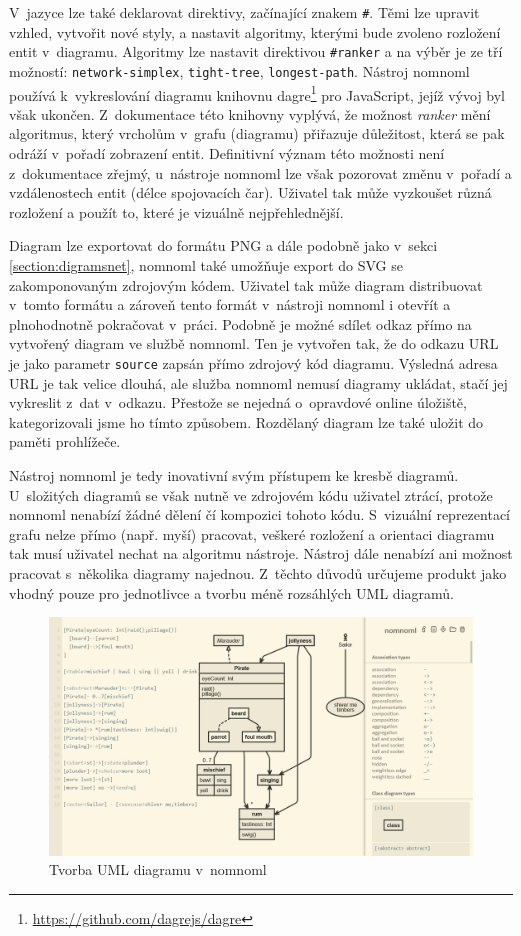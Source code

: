 V~jazyce lze také deklarovat direktivy, začínající znakem \texttt{\#}. Těmi lze
upravit vzhled, vytvořit nové styly, a nastavit algoritmy, kterými bude zvoleno
rozložení entit v~diagramu. Algoritmy lze nastavit direktivou \texttt{\#ranker}
a na výběr je ze tří možností: \texttt{network-simplex}, \texttt{tight-tree},
\texttt{longest-path}. Nástroj nomnoml používá k~vykreslování diagramu knihovnu
dagre\footnote{\url{https://github.com/dagrejs/dagre}} pro JavaScript, jejíž
vývoj byl však ukončen. Z~dokumentace této knihovny vyplývá, že možnost
\emph{ranker} mění algoritmus, který vrcholům v~grafu (diagramu) přiřazuje
důležitost, která se pak odráží v~pořadí zobrazení entit. Definitivní význam
této možnosti není z~dokumentace zřejmý, u~nástroje nomnoml lze však pozorovat
změnu v~pořadí a vzdálenostech entit (délce spojovacích čar). Uživatel tak může
vyzkoušet různá rozložení a použít to, které je vizuálně nejpřehlednější.

Diagram lze exportovat do formátu PNG a dále podobně jako v~sekci
\ref{section:digramsnet}, nomnoml také umožňuje export do SVG se zakomponovaným
zdrojovým kódem. Uživatel tak může diagram distribuovat v~tomto formátu a
zároveň tento formát v~nástroji nomnoml i otevřít a plnohodnotně pokračovat
v~práci. Podobně je možné sdílet odkaz přímo na vytvořený diagram ve službě
nomnoml. Ten je vytvořen tak, že do odkazu URL je jako parametr \texttt{source}
zapsán přímo zdrojový kód diagramu. Výsledná adresa URL je tak velice dlouhá,
ale služba nomnoml nemusí diagramy ukládat, stačí jej vykreslit z~dat v~odkazu.
Přestože se nejedná o~opravdové online úložiště, kategorizovali jsme ho tímto
způsobem. Rozdělaný diagram lze také uložit do paměti prohlížeče.

Nástroj nomnoml je tedy inovativní svým přístupem ke kresbě diagramů.
U~složitých diagramů se však nutně ve zdrojovém kódu uživatel ztrácí, protože
nomnoml nenabízí žádné dělení čí kompozici tohoto kódu. S~vizuální reprezentací
grafu nelze přímo (např. myší) pracovat, veškeré rozložení a orientaci diagramu
tak musí uživatel nechat na algoritmu nástroje. Nástroj dále nenabízí ani
možnost pracovat s~několika diagramy najednou. Z~těchto důvodů určujeme produkt
jako vhodný pouze pro jednotlivce a tvorbu méně rozsáhlých UML diagramů.

\begin{figure}
  \centering
  \includegraphics[width=\textwidth]{../img/nomnoml.png}
  \caption{Tvorba UML diagramu v~nomnoml}
  \label{fig:nomnoml}
\end{figure}


